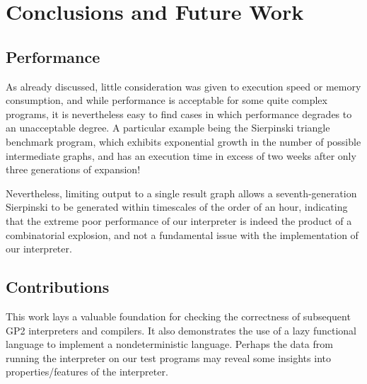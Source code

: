 
\section{Conclusions and Future Work}
\label{sec:conclusionsfuture}

\subsection{Performance}

As already discussed, little consideration was given to execution speed or memory consumption, and while performance is acceptable for some quite complex programs, it is nevertheless easy to find cases in which performance degrades to an unacceptable degree. A particular example being the Sierpinski triangle benchmark program, which exhibits exponential growth in the number of possible intermediate graphs, and has an execution time in excess of two weeks after only three generations of expansion!


Nevertheless, limiting output to a single result graph allows a seventh-generation Sierpinski to be generated within timescales of the order of an hour, indicating that the extreme poor performance of our interpreter is indeed the product of a combinatorial explosion, and not a fundamental issue with the implementation of our interpreter.


\subsection{Contributions}

This work lays a valuable foundation for checking the correctness of subsequent GP2 interpreters and compilers. It also demonstrates the use of a lazy functional language to implement a nondeterministic language. Perhaps the data from running the interpreter on our test programs may reveal some insights into properties/features of the interpreter.




